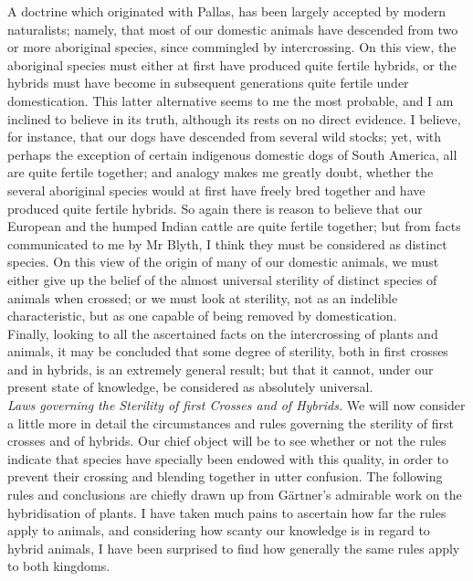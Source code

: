 \indent A doctrine which originated with Pallas, has been largely accepted by modern naturalists; namely, that most of our domestic animals have descended from two or more aboriginal species, since commingled by intercrossing. On this view, the aboriginal species must either at first have produced quite fertile hybrids, or the hybrids must have become in subsequent generations quite fertile under domestication. This latter alternative seems to me the most probable, and I am inclined to believe in its truth, although its rests on no direct evidence. I believe, for instance, that our dogs have descended from several wild stocks; yet, with perhaps the exception of certain indigenous domestic dogs of South America, all are quite fertile together; and analogy makes me greatly doubt, whether the several aboriginal species would at first have freely bred together and have produced quite fertile hybrids. So again there is reason to believe that our European and the humped Indian cattle are quite fertile together; but from facts communicated to me by Mr Blyth, I think they must be considered as distinct species. On this view of the origin of many of our domestic animals, we must either give up the belief of the almost universal sterility of distinct species of animals when crossed; or we must look at sterility, not as an indelible characteristic, but as one capable of being removed by domestication.\\
\indent Finally, looking to all the ascertained facts on the intercrossing of plants and animals, it may be concluded that some degree of sterility, both in first crosses and in hybrids, is an extremely general result; but that it cannot, under our present state of knowledge, be considered as absolutely universal.\\
\indent \emph{Laws governing the Sterility of first Crosses and of Hybrids.} We will now consider a little more in detail the circumstances and rules governing the sterility of first crosses and of hybrids. Our chief object will be to see whether or not the rules indicate that species have specially been endowed with this quality, in order to prevent their crossing and blending together in utter confusion. The following rules and conclusions are chiefly drawn up from G\"{a}rtner's admirable work on the hybridisation of plants. I have taken much pains to ascertain how far the rules apply to animals, and considering how scanty our knowledge is in regard to hybrid animals, I have been surprised to find how generally the same rules apply to both kingdoms.\\
